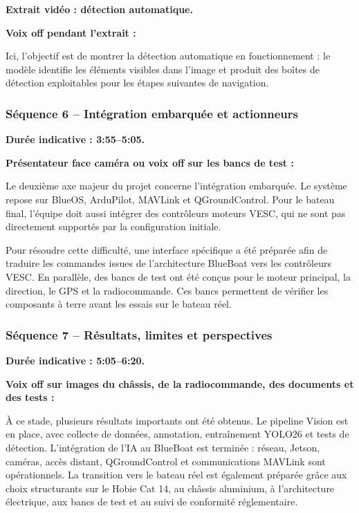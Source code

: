 \documentclass[11pt,letterpaper]{article}
\begin{document}
\textbf{Extrait vidéo : détection automatique.}

\textbf{Voix off pendant l'extrait :}

Ici, l'objectif est de montrer la détection automatique en fonctionnement : le modèle identifie les éléments visibles dans l'image et produit des boîtes de détection exploitables pour les étapes suivantes de navigation.

\subsubsection*{Séquence 6 -- Intégration embarquée et actionneurs}
\textbf{Durée indicative : 3:55--5:05.}

\textbf{Présentateur face caméra ou voix off sur les bancs de test :}

Le deuxième axe majeur du projet concerne l'intégration embarquée. Le système repose sur BlueOS, ArduPilot, MAVLink et QGroundControl. Pour le bateau final, l'équipe doit aussi intégrer des contrôleurs moteurs VESC, qui ne sont pas directement supportés par la configuration initiale.

Pour résoudre cette difficulté, une interface spécifique a été préparée afin de traduire les commandes issues de l'architecture BlueBoat vers les contrôleurs VESC. En parallèle, des bancs de test ont été conçus pour le moteur principal, la direction, le GPS et la radiocommande. Ces bancs permettent de vérifier les composants à terre avant les essais sur le bateau réel.

\subsubsection*{Séquence 7 -- Résultats, limites et perspectives}
\textbf{Durée indicative : 5:05--6:20.}

\textbf{Voix off sur images du châssis, de la radiocommande, des documents et des tests :}

À ce stade, plusieurs résultats importants ont été obtenus. Le pipeline Vision est en place, avec collecte de données, annotation, entraînement YOLO26 et tests de détection. L'intégration de l'IA au BlueBoat est terminée : réseau, Jetson, caméras, accès distant, QGroundControl et communications MAVLink sont opérationnels. La transition vers le bateau réel est également préparée grâce aux choix structurants sur le Hobie Cat 14, au châssis aluminium, à l'architecture électrique, aux bancs de test et au suivi de conformité réglementaire.
\end{document}
